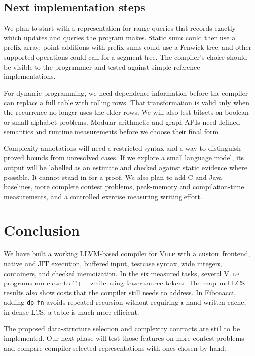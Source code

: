 \documentclass[12pt,a4paper]{report}
\newcommand{\vulp}{\textsc{Vulp}}
\begin{document}
\section{Next implementation steps}
We plan to start with a representation for range queries that records exactly which updates and queries the program makes. Static sums could then use a prefix array; point additions with prefix sums could use a Fenwick tree; and other supported operations could call for a segment tree. The compiler's choice should be visible to the programmer and tested against simple reference implementations.

For dynamic programming, we need dependence information before the compiler can replace a full table with rolling rows. That transformation is valid only when the recurrence no longer uses the older rows. We will also test bitsets on boolean or small-alphabet problems. Modular arithmetic and graph APIs need defined semantics and runtime measurements before we choose their final form.

Complexity annotations will need a restricted syntax and a way to distinguish proved bounds from unresolved cases. If we explore a small language model, its output will be labelled as an estimate and checked against static evidence where possible. It cannot stand in for a proof. We also plan to add C and Java baselines, more complete contest problems, peak-memory and compilation-time measurements, and a controlled exercise measuring writing effort.

\chapter{Conclusion}
We have built a working LLVM-based compiler for \vulp{} with a custom frontend, native and JIT execution, buffered input, testcase syntax, wide integers, containers, and checked memoization. In the six measured tasks, several \vulp{} programs run close to C++ while using fewer source tokens. The map and LCS results also show costs that the compiler still needs to address. In Fibonacci, adding \texttt{dp fn} avoids repeated recursion without requiring a hand-written cache; in dense LCS, a table is much more efficient.

The proposed data-structure selection and complexity contracts are still to be implemented. Our next phase will test those features on more contest problems and compare compiler-selected representations with ones chosen by hand.
\end{document}
